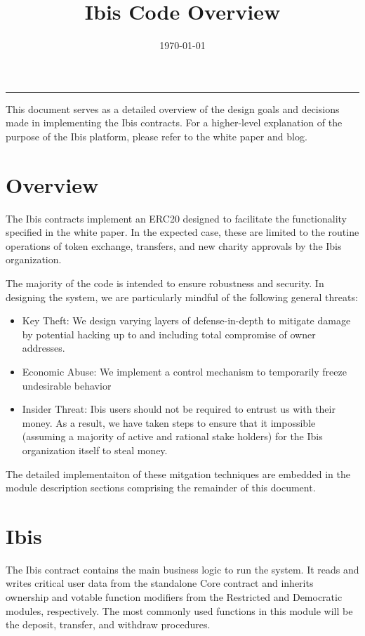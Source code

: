 \documentclass{article}
\title{\vspace{-5ex}Ibis Code Overview}
\date{\vspace{-8ex}\today}
\begin{document}
\maketitle
\noindent\rule{\textwidth}{1pt}

This document serves as a detailed overview of the design goals and decisions
made in implementing the Ibis contracts. For a higher-level explanation of the
purpose of the Ibis platform, please refer to the white paper and blog.

\section{Overview}

The Ibis contracts implement an ERC20 designed to facilitate the functionality
specified in the white paper. In the expected case, these are limited to the
routine operations of token exchange, transfers, and new charity approvals by
the Ibis organization.

The majority of the code is intended to ensure robustness and security. In
designing the system, we are particularly mindful of the following general
threats:

\begin{itemize}
\item Key Theft: We design varying layers of defense-in-depth to mitigate damage
  by potential hacking up to and including total compromise of owner addresses.
\item Economic Abuse: We implement a control mechanism to temporarily freeze
  undesirable behavior
\item Insider Threat: Ibis users should not be required to entrust us with their
  money. As a result, we have taken steps to ensure that it impossible (assuming
  a majority of active and rational stake holders) for the Ibis organization
  itself to steal money.
\end{itemize}

The detailed implementaiton of these mitgation techniques are embedded in the
module description sections comprising the remainder of this document.

\section{Ibis}

The Ibis contract contains the main business logic to run the system. It reads
and writes critical user data from the standalone Core contract and inherits
ownership and votable function modifiers from the Restricted and Democratic
modules, respectively. The most commonly used functions in this module will be
the deposit, transfer, and withdraw procedures.
\end{document}
